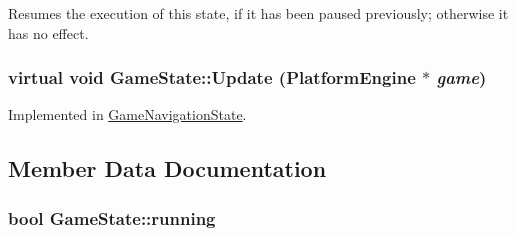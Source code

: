 Resumes the execution of this state, if it has been paused previously; otherwise it has no effect. \hypertarget{class_game_state_100ca49bc95afce1d5c5b756708bbc2b}{
\subsubsection[{Update}]{\setlength{\rightskip}{0pt plus 5cm}virtual void GameState::Update ({\bf PlatformEngine} $\ast$ {\em game})}}
\label{dd/d87/class_game_state_100ca49bc95afce1d5c5b756708bbc2b}




Implemented in \hyperlink{class_game_navigation_state_90f5e6d6287a875d8f2737180f46a004}{GameNavigationState}.

\subsection{Member Data Documentation}
\hypertarget{class_game_state_391df04a740c7480270d3c71a578b43a}{
\subsubsection[{running}]{\setlength{\rightskip}{0pt plus 5cm}bool {\bf GameState::running}}}
\label{dd/d87/class_game_state_391df04a740c7480270d3c71a578b43a}


